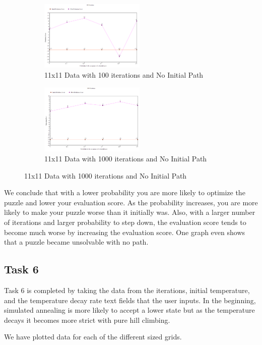 \documentclass[11pt, oneside]{article}   	%
\begin{document}
\begin{figure}[H]
\centering
\begin{subfigure}{.5\textwidth}
	\centering
	\includegraphics[width=50mm]{11x11downPath.png}
	\caption{11x11 Data with 100 iterations and No Initial Path}
	\label{fig:method}
\end{subfigure}%
\begin{subfigure}{.5\textwidth}
	\centering
	\includegraphics[width=50mm]{11x11downPath2.png}
	\caption{11x11 Data with 1000 iterations and No Initial Path}
	\label{fig:method}
\end{subfigure}
\end{figure}

We conclude that with a lower probability you are more likely to optimize the puzzle and lower your evaluation score. As the probability increases, you are more likely to make your puzzle worse than it initially was. Also, with a larger number of iterations and larger probability to step down, the evaluation score tends to become much worse by increasing the evaluation score. One graph even shows that a puzzle became unsolvable with no path.

\subsection{Task 6}
Task 6 is completed by taking the data from the iterations, initial temperature, and the temperature decay rate text fields that the user inputs. In the beginning, simulated annealing is more likely to accept a lower state but as the temperature decays it becomes more strict with pure hill climbing.

We have plotted data for each of the different sized grids.
\end{document}
